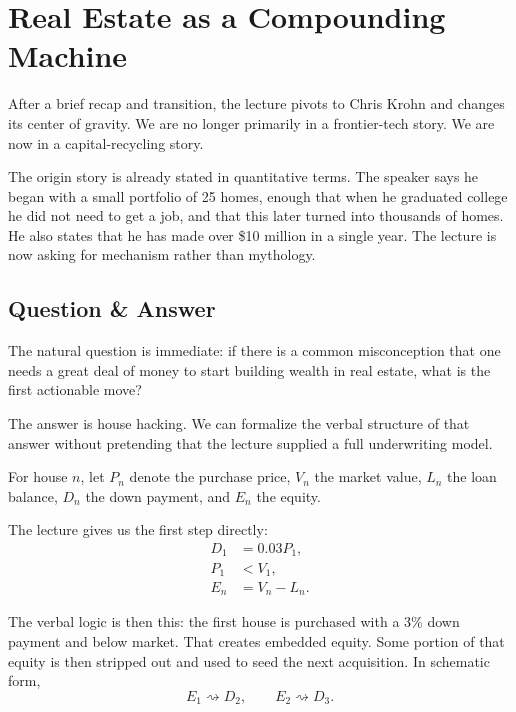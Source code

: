 \section{Real Estate as a Compounding Machine}

After a brief recap and transition, the lecture pivots to Chris Krohn and changes its center of gravity. We are no longer primarily in a frontier-tech story. We are now in a capital-recycling story.

The origin story is already stated in quantitative terms. The speaker says he began with a small portfolio of 25 homes, enough that when he graduated college he did not need to get a job, and that this later turned into thousands of homes. He also states that he has made over \$10 million in a single year. The lecture is now asking for mechanism rather than mythology.

\subsection{Question \& Answer}

The natural question is immediate: if there is a common misconception that one needs a great deal of money to start building wealth in real estate, what is the first actionable move?

The answer is house hacking. We can formalize the verbal structure of that answer without pretending that the lecture supplied a full underwriting model.

\begin{definition}
For house \(n\), let \(P_n\) denote the purchase price, \(V_n\) the market value, \(L_n\) the loan balance, \(D_n\) the down payment, and \(E_n\) the equity.
\end{definition}

The lecture gives us the first step directly:
\begin{align}
D_1 &= 0.03 P_1,\\
P_1 &< V_1,\\
E_n &= V_n - L_n.
\end{align}

The verbal logic is then this: the first house is purchased with a \(3\%\) down payment and below market. That creates embedded equity. Some portion of that equity is then stripped out and used to seed the next acquisition. In schematic form,
\begin{equation}
E_1 \rightsquigarrow D_2,\qquad E_2 \rightsquigarrow D_3.
\end{equation}

